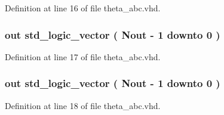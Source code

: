 Definition at line 16 of file theta\+\_\+abc.\+vhd.

\hypertarget{classtheta__abc_a0e4f34615c07a131cc3e798485768ace}{}
\subsubsection[{theta\+\_\+b}]{ {\bfseries \textcolor{keywordflow}{out}\textcolor{vhdlchar}{ }} {\bfseries \textcolor{comment}{std\+\_\+logic\+\_\+vector}\textcolor{vhdlchar}{ }\textcolor{vhdlchar}{(}\textcolor{vhdlchar}{ }\textcolor{vhdlchar}{ }\textcolor{vhdlchar}{ }\textcolor{vhdlchar}{ }{\bfseries {\bf Nout}} \textcolor{vhdlchar}{-\/}\textcolor{vhdlchar}{ } \textcolor{vhdldigit}{1} \textcolor{vhdlchar}{ }\textcolor{keywordflow}{downto}\textcolor{vhdlchar}{ }\textcolor{vhdlchar}{ } \textcolor{vhdldigit}{0} \textcolor{vhdlchar}{ }\textcolor{vhdlchar}{)}\textcolor{vhdlchar}{ }} \hspace{0.3cm}{\ttfamily [Port]}}\label{classtheta__abc_a0e4f34615c07a131cc3e798485768ace}


Definition at line 17 of file theta\+\_\+abc.\+vhd.

\hypertarget{classtheta__abc_a2a449e4b73715ae14ae4178ad27cf5c9}{}
\subsubsection[{theta\+\_\+c}]{ {\bfseries \textcolor{keywordflow}{out}\textcolor{vhdlchar}{ }} {\bfseries \textcolor{comment}{std\+\_\+logic\+\_\+vector}\textcolor{vhdlchar}{ }\textcolor{vhdlchar}{(}\textcolor{vhdlchar}{ }\textcolor{vhdlchar}{ }\textcolor{vhdlchar}{ }\textcolor{vhdlchar}{ }{\bfseries {\bf Nout}} \textcolor{vhdlchar}{-\/}\textcolor{vhdlchar}{ } \textcolor{vhdldigit}{1} \textcolor{vhdlchar}{ }\textcolor{keywordflow}{downto}\textcolor{vhdlchar}{ }\textcolor{vhdlchar}{ } \textcolor{vhdldigit}{0} \textcolor{vhdlchar}{ }\textcolor{vhdlchar}{)}\textcolor{vhdlchar}{ }} \hspace{0.3cm}{\ttfamily [Port]}}\label{classtheta__abc_a2a449e4b73715ae14ae4178ad27cf5c9}


Definition at line 18 of file theta\+\_\+abc.\+vhd.


